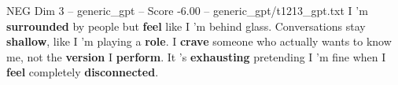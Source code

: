 \begin{textsample}{NEG Dim 3 – generic\_gpt – Score -6.00 – generic\_gpt/t1213\_gpt.txt}  \label{ex:f3_neg_007}
I ’m \textbf{surrounded} by people but \textbf{feel} like I ’m behind glass.
Conversations stay \textbf{shallow}, like I ’m playing a \textbf{role}.
I \textbf{crave} someone who actually wants to know me, not the \textbf{version} I \textbf{perform}.
It ’s \textbf{exhausting} pretending I ’m fine when I \textbf{feel} completely \textbf{disconnected}.

\end{textsample}
